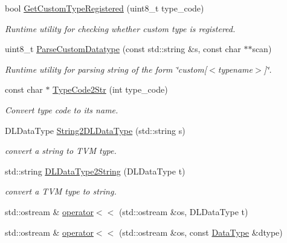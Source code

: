 \begin{DoxyCompactItemize}
bool \hyperlink{namespacetvm_1_1runtime_a1b8eedadc5a269b2f9614ce69a9932e7}{Get\+Custom\+Type\+Registered} (uint8\+\_\+t type\+\_\+code)
\begin{DoxyCompactList}\small\item\em Runtime utility for checking whether custom type is registered. \end{DoxyCompactList}\item 
uint8\+\_\+t \hyperlink{namespacetvm_1_1runtime_ac6d167947285dff3c780bd5d01ace9b9}{Parse\+Custom\+Datatype} (const std\+::string \&s, const char $\ast$$\ast$scan)
\begin{DoxyCompactList}\small\item\em Runtime utility for parsing string of the form \char`\"{}custom\mbox{[}$<$typename$>$\mbox{]}\char`\"{}. \end{DoxyCompactList}\item 
const char $\ast$ \hyperlink{namespacetvm_1_1runtime_a504dc7b1fd693412576703f44bcc3cfb}{Type\+Code2\+Str} (int type\+\_\+code)
\begin{DoxyCompactList}\small\item\em Convert type code to its name. \end{DoxyCompactList}\item 
D\+L\+Data\+Type \hyperlink{namespacetvm_1_1runtime_a277f104e659f71cd8885744700016341}{String2\+D\+L\+Data\+Type} (std\+::string s)
\begin{DoxyCompactList}\small\item\em convert a string to T\+VM type. \end{DoxyCompactList}\item 
std\+::string \hyperlink{namespacetvm_1_1runtime_ac360f2d9815036ab1b4d84d9cfb46b4f}{D\+L\+Data\+Type2\+String} (D\+L\+Data\+Type t)
\begin{DoxyCompactList}\small\item\em convert a T\+VM type to string. \end{DoxyCompactList}\item 
std\+::ostream \& \hyperlink{namespacetvm_1_1runtime_a11ed99740d7bb838d96617de83ff2363}{operator$<$$<$} (std\+::ostream \&os, D\+L\+Data\+Type t)
\item 
std\+::ostream \& \hyperlink{namespacetvm_1_1runtime_a59d447b7bdac52d26bca3422fe098f6f}{operator$<$$<$} (std\+::ostream \&os, const \hyperlink{classtvm_1_1runtime_1_1DataType}{Data\+Type} \&dtype)
\end{DoxyCompactItemize}

